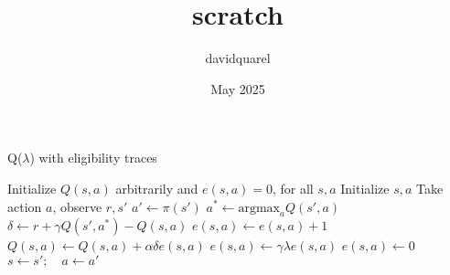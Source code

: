 \documentclass{article}
\title{scratch}
\author{davidquarel }
\date{May 2025}
\begin{document}
\begin{algorithm}[H]
\caption{Q($\lambda$) with eligibility traces}
\begin{algorithmic}[1]
\State Initialize $Q(s,a)$ arbitrarily and $e(s,a) = 0$, for all $s,a$
\Repeat {}
    \State Initialize $s, a$
    \Repeat {}
        \State Take action $a$, observe $r, s'$
        \State $a' \gets \pi(s')$ 
        \State $a^* \gets \text{argmax}_a Q(s',a)$
        \State $\delta \gets r + \gamma Q(s', a^*) - Q(s, a)$
        \State $e(s,a) \gets e(s,a) + 1$
            \State $Q(s,a) \gets Q(s,a) + \alpha \delta e(s,a)$
                \State $e(s,a) \gets \gamma \lambda e(s,a)$
            \Else
                \State $e(s,a) \gets 0$
            \EndIf
        \EndFor
        \State $s \gets s'; \quad a \gets a'$
\end{algorithmic}
\end{algorithm}
\end{document}
